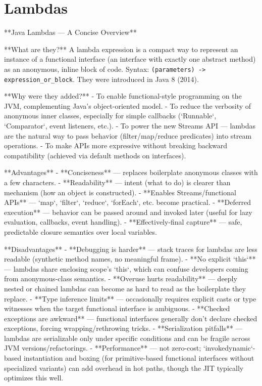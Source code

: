 
\section{Lambdas}\label{sec:Lambdas}


**Java Lambdas — A Concise Overview**

**What are they?**
A lambda expression is a compact way to represent an instance of a functional interface (an interface with exactly one abstract method) as an anonymous, inline block of code. 
Syntax: \lstinline|(parameters) -> expression_or_block|. They were introduced in Java 8 (2014).

**Why were they added?**
- To enable functional-style programming on the JVM, complementing Java's object-oriented model.
- To reduce the verbosity of anonymous inner classes, especially for simple callbacks (`Runnable`, `Comparator`, event listeners, etc.).
- To power the new Streams API — lambdas are the natural way to pass behavior (filter/map/reduce predicates) into stream operations.
- To make APIs more expressive without breaking backward compatibility (achieved via default methods on interfaces).

**Advantages**
- **Conciseness** — replaces boilerplate anonymous classes with a few characters.
- **Readability** — intent (what to do) is clearer than mechanism (how an object is constructed).
- **Enables Streams/functional APIs** — `map`, `filter`, `reduce`, `forEach`, etc. become practical.
- **Deferred execution** — behavior can be passed around and invoked later (useful for lazy evaluation, callbacks, event handling).
- **Effectively-final capture** — safe, predictable closure semantics over local variables.

**Disadvantages**
- **Debugging is harder** — stack traces for lambdas are less readable (synthetic method names, no meaningful frame).
- **No explicit `this`** — lambdas share enclosing scope's `this`, which can confuse developers coming from anonymous-class semantics.
- **Overuse hurts readability** — deeply nested or chained lambdas can become as hard to read as the boilerplate they replace.
- **Type inference limits** — occasionally requires explicit casts or type witnesses when the target functional interface is ambiguous.
- **Checked exceptions are awkward** — functional interfaces generally don't declare checked exceptions, forcing wrapping/rethrowing tricks.
- **Serialization pitfalls** — lambdas are serializable only under specific conditions and can be fragile across JVM versions/refactorings.
- **Performance** — not zero-cost; `invokedynamic`-based instantiation and boxing (for primitive-based functional interfaces without specialized variants) can add overhead in hot paths, though the JIT typically optimizes this well.


